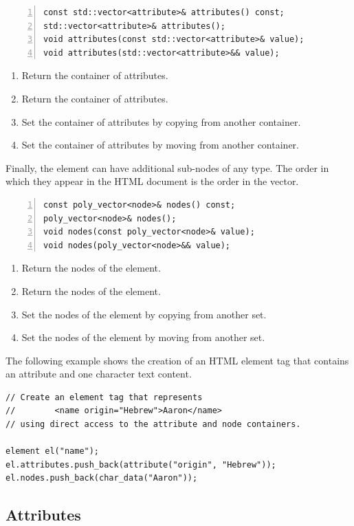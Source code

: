 \documentclass[10pt,a4paper,openany]{mudbook}
\newenvironment{enumeratedef}
  {\begin{enumerate}[topsep=0.5em,itemsep=0em,parsep=0em,font=\small]
     \small}
  {\end{enumerate}}
\begin{document}
\begin{lstlisting}[style=definition,numbers=left]
const std::vector<attribute>& attributes() const;
std::vector<attribute>& attributes();
void attributes(const std::vector<attribute>& value);
void attributes(std::vector<attribute>&& value);
\end{lstlisting}
\begin{enumeratedef}
  \item Return the container of attributes.
  \item Return the container of attributes.
  \item Set the container of attributes by copying from another container.
  \item Set the container of attributes by moving from another container.
\end{enumeratedef}

Finally, the element can have additional sub-nodes of any type. The order
in which they appear in the HTML document is the order in the vector.

\begin{lstlisting}[style=definition,numbers=left]
const poly_vector<node>& nodes() const;
poly_vector<node>& nodes();
void nodes(const poly_vector<node>& value);
void nodes(poly_vector<node>&& value);
\end{lstlisting}
\begin{enumeratedef}
  \item Return the nodes of the element.
  \item Return the nodes of the element.
  \item Set the nodes of the element by copying from another set.
  \item Set the nodes of the element by moving from another set.
\end{enumeratedef}

The following example shows the creation of an HTML element tag that
contains an attribute and one character text content.

\begin{lstlisting}[style=snippet]
// Create an element tag that represents
//        <name origin="Hebrew">Aaron</name>
// using direct access to the attribute and node containers.

element el("name");
el.attributes.push_back(attribute("origin", "Hebrew"));
el.nodes.push_back(char_data("Aaron"));
\end{lstlisting}

\subsection{Attributes}
\end{document}
